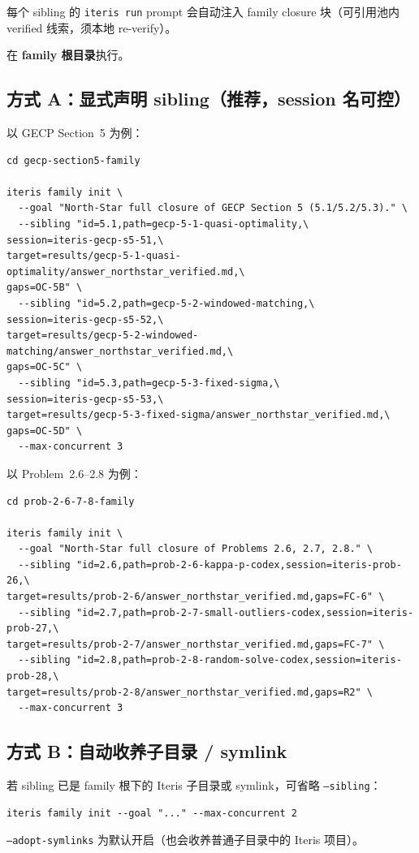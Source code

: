 \documentclass[11pt,a4paper]{ctexart}
\begin{document}
每个 sibling 的 \texttt{iteris run} prompt 会自动注入 family closure 块（可引用池内 verified 线索，须本地 re-verify）。

\label{sec:init}

在 \textbf{family 根目录}执行。

\subsection{方式 A：显式声明 sibling（推荐，session 名可控）}

以 GECP Section~5 为例：
\begin{lstlisting}[style=shell]
cd gecp-section5-family

iteris family init \
  --goal "North-Star full closure of GECP Section 5 (5.1/5.2/5.3)." \
  --sibling "id=5.1,path=gecp-5-1-quasi-optimality,\
session=iteris-gecp-s5-51,\
target=results/gecp-5-1-quasi-optimality/answer_northstar_verified.md,\
gaps=OC-5B" \
  --sibling "id=5.2,path=gecp-5-2-windowed-matching,\
session=iteris-gecp-s5-52,\
target=results/gecp-5-2-windowed-matching/answer_northstar_verified.md,\
gaps=OC-5C" \
  --sibling "id=5.3,path=gecp-5-3-fixed-sigma,\
session=iteris-gecp-s5-53,\
target=results/gecp-5-3-fixed-sigma/answer_northstar_verified.md,\
gaps=OC-5D" \
  --max-concurrent 3
\end{lstlisting}

以 Problem~2.6--2.8 为例：
\begin{lstlisting}[style=shell]
cd prob-2-6-7-8-family

iteris family init \
  --goal "North-Star full closure of Problems 2.6, 2.7, 2.8." \
  --sibling "id=2.6,path=prob-2-6-kappa-p-codex,session=iteris-prob-26,\
target=results/prob-2-6/answer_northstar_verified.md,gaps=FC-6" \
  --sibling "id=2.7,path=prob-2-7-small-outliers-codex,session=iteris-prob-27,\
target=results/prob-2-7/answer_northstar_verified.md,gaps=FC-7" \
  --sibling "id=2.8,path=prob-2-8-random-solve-codex,session=iteris-prob-28,\
target=results/prob-2-8/answer_northstar_verified.md,gaps=R2" \
  --max-concurrent 3
\end{lstlisting}

\subsection{方式 B：自动收养子目录 / symlink}

若 sibling 已是 family 根下的 Iteris 子目录或 symlink，可省略 \texttt{--sibling}：
\begin{lstlisting}[style=shell]
iteris family init --goal "..." --max-concurrent 2
\end{lstlisting}
\texttt{--adopt-symlinks} 为默认开启（也会收养普通子目录中的 Iteris 项目）。
\end{document}
